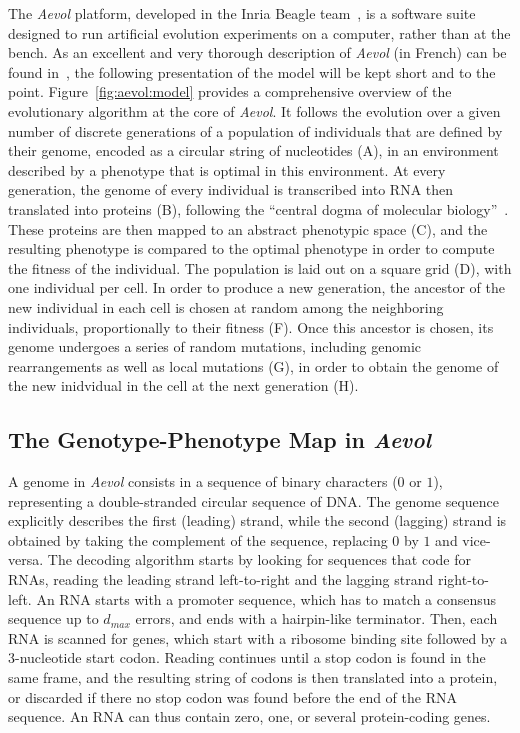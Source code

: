The \emph{Aevol} platform, developed in the Inria Beagle team~\citep{rutten2019}, is a software suite designed to run artificial evolution experiments on a computer, rather than at the bench.
As an excellent and very thorough description of \emph{Aevol} (in French) can be found in~\cite{liard2020b}, the following presentation of the model will be kept short and to the point.
Figure~\ref{fig:aevol:model} provides a comprehensive overview of the evolutionary algorithm at the core of \emph{Aevol}.
It follows the evolution over a given number of discrete generations of a population of individuals that are defined by their genome, encoded as a circular string of nucleotides (A), in an environment described by a phenotype that is optimal in this environment.
At every generation, the genome of every individual is transcribed into RNA then translated into proteins (B), following the ``central dogma of molecular biology''~\citep{crick1958}.
These proteins are then mapped to an abstract phenotypic space (C), and the resulting phenotype is compared to the optimal phenotype in order to compute the fitness of the individual.
The population is laid out on a square grid (D), with one individual per cell.
In order to produce a new generation, the ancestor of the new individual in each cell is chosen at random among the neighboring individuals, proportionally to their fitness (F).
Once this ancestor is chosen, its genome undergoes a series of random mutations, including genomic rearrangements as well as local mutations (G), in order to obtain the genome of the new inidvidual in the cell at the next generation (H).

\subsection{The Genotype-Phenotype Map in \emph{Aevol}}

A genome in \emph{Aevol} consists in a sequence of binary characters ($0$ or $1$), representing a double-stranded circular sequence of DNA.
The genome sequence explicitly describes the first (leading) strand, while the second (lagging) strand is obtained by taking the complement of the sequence, replacing $0$ by $1$ and vice-versa.
The decoding algorithm starts by looking for sequences that code for RNAs, reading the leading strand left-to-right and the lagging strand right-to-left.
An RNA starts with a promoter sequence, which has to match a consensus sequence up to $d_{max}$ errors, and ends with a hairpin-like terminator.
Then, each RNA is scanned for genes, which start with a ribosome binding site followed by a 3-nucleotide start codon.
Reading continues until a stop codon is found in the same frame, and the resulting string of codons is then translated into a protein, or discarded if there no stop codon was found before the end of the RNA sequence.
An RNA can thus contain zero, one, or several protein-coding genes.

